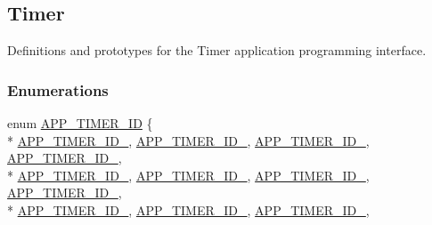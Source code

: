 \hypertarget{group___t_i_m_e_r}{}\subsection{Timer}
\label{group___t_i_m_e_r}


Definitions and prototypes for the Timer application programming interface.  


\subsubsection*{Enumerations}
\begin{DoxyCompactItemize}
\item 
enum \hyperlink{group___t_i_m_e_r_ga066b1254d4f15cdbcfecca34eff53308}{A\+P\+P\+\_\+\+T\+I\+M\+E\+R\+\_\+\+ID} \{ \\*
\hyperlink{group___t_i_m_e_r_gga066b1254d4f15cdbcfecca34eff53308ab7f56a87c5323b7258ef8d9af40bedbb}{A\+P\+P\+\_\+\+T\+I\+M\+E\+R\+\_\+\+I\+D\+\_}, 
\hyperlink{group___t_i_m_e_r_gga066b1254d4f15cdbcfecca34eff53308ab784bd9ec5a511d9ea4843770894c529}{A\+P\+P\+\_\+\+T\+I\+M\+E\+R\+\_\+\+I\+D\+\_}, 
\hyperlink{group___t_i_m_e_r_gga066b1254d4f15cdbcfecca34eff53308a0130b461d4dc83efa808b3e80d1419ac}{A\+P\+P\+\_\+\+T\+I\+M\+E\+R\+\_\+\+I\+D\+\_}, 
\hyperlink{group___t_i_m_e_r_gga066b1254d4f15cdbcfecca34eff53308a02553850cedb3d9bbf3fc5ecd9506db8}{A\+P\+P\+\_\+\+T\+I\+M\+E\+R\+\_\+\+I\+D\+\_}, 
\\*
\hyperlink{group___t_i_m_e_r_gga066b1254d4f15cdbcfecca34eff53308a0179163382370ff5ec96192606e9e046}{A\+P\+P\+\_\+\+T\+I\+M\+E\+R\+\_\+\+I\+D\+\_}, 
\hyperlink{group___t_i_m_e_r_gga066b1254d4f15cdbcfecca34eff53308ad44d9de4f08d340425a98a8dc270a329}{A\+P\+P\+\_\+\+T\+I\+M\+E\+R\+\_\+\+I\+D\+\_}, 
\hyperlink{group___t_i_m_e_r_gga066b1254d4f15cdbcfecca34eff53308a675605426484cda3af62122d8f1329d9}{A\+P\+P\+\_\+\+T\+I\+M\+E\+R\+\_\+\+I\+D\+\_}, 
\hyperlink{group___t_i_m_e_r_gga066b1254d4f15cdbcfecca34eff53308a44113a8ed8af91bb071cdc06fcfecc9a}{A\+P\+P\+\_\+\+T\+I\+M\+E\+R\+\_\+\+I\+D\+\_}, 
\\*
\hyperlink{group___t_i_m_e_r_gga066b1254d4f15cdbcfecca34eff53308a291372e60dfbbfa0e8b343e8a43c1af4}{A\+P\+P\+\_\+\+T\+I\+M\+E\+R\+\_\+\+I\+D\+\_}, 
\hyperlink{group___t_i_m_e_r_gga066b1254d4f15cdbcfecca34eff53308a6f3a540d2666f985c1613245038bc508}{A\+P\+P\+\_\+\+T\+I\+M\+E\+R\+\_\+\+I\+D\+\_}, 
\hyperlink{group___t_i_m_e_r_gga066b1254d4f15cdbcfecca34eff53308a587c5e21625d85dd7dafa7d21088c00d}{A\+P\+P\+\_\+\+T\+I\+M\+E\+R\+\_\+\+I\+D\+\_}, 

\end{DoxyCompactItemize}
